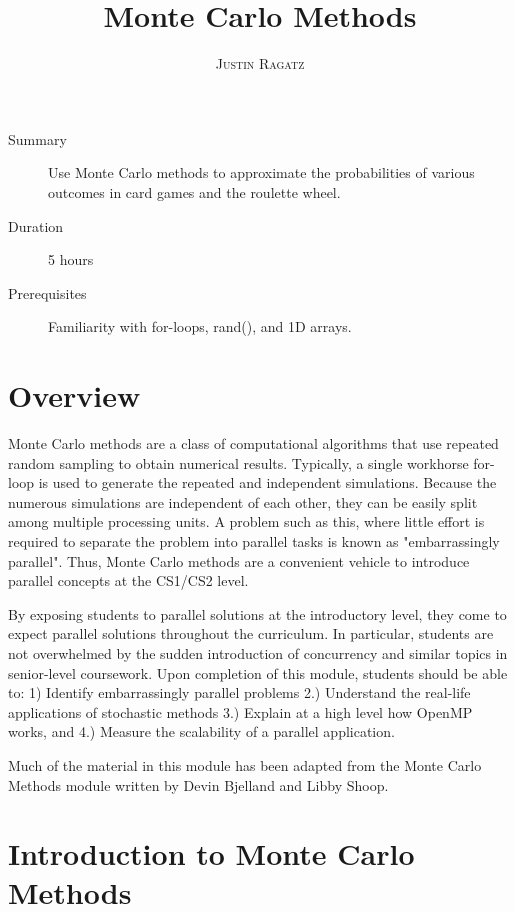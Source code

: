 \documentclass[a4paper, 11pt]{article}
\title{\textbf{Monte Carlo Methods}}
\author{\textsc{Justin Ragatz}}
\makeatletter
\renewcommand{\maketitle}
{
	\begin{flushright}
	{\LARGE\@title}

	\vspace{20pt}

	{\large\@author}

	\end{flushright}
}
\makeatother
\begin{document}
\maketitle
\bigskip

\begin{description}
  \item[Summary] Use Monte Carlo methods to approximate the probabilities of various outcomes in card games and the roulette wheel.
  \item[Duration] 5 hours
  \item[Prerequisites] Familiarity with for-loops, rand(), and 1D arrays.
\end{description}

\section{Overview}

Monte Carlo methods are a class of computational algorithms that use repeated random sampling to obtain numerical results. Typically, a single workhorse for-loop is used to generate the repeated and independent simulations. Because the numerous simulations are independent of each other, they can be easily split among multiple processing units. A problem such as this, where little effort is required to separate the problem into parallel tasks is known as "embarrassingly parallel". Thus, Monte Carlo methods are a convenient vehicle to introduce parallel concepts at the CS1/CS2 level. 

By exposing students to parallel solutions at the introductory level, they come to expect parallel solutions throughout the curriculum. In particular, students are not overwhelmed by the sudden introduction of concurrency and similar topics in senior-level coursework. Upon completion of this module, students should be able to: 1) Identify embarrassingly parallel problems 2.) Understand the real-life applications of stochastic methods 3.) Explain at a high level how OpenMP works, and 4.) Measure the scalability of a parallel application.

Much of the material in this module has been adapted from the Monte Carlo Methods module written by Devin Bjelland and Libby Shoop\cite{website:shoop:2015}.

\section{Introduction to Monte Carlo Methods}
\end{document}
